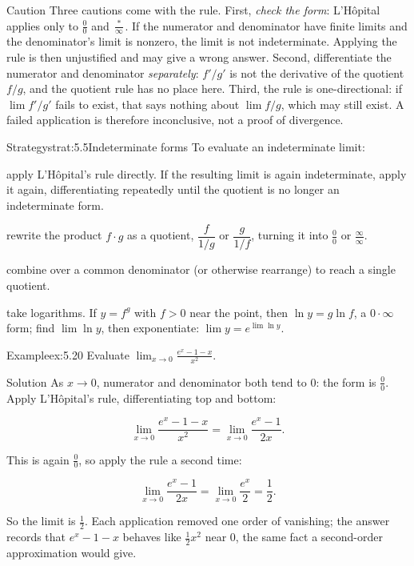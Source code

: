 \documentclass[a4paper,12pt,oneside]{memoir}
\begin{document}
\begin{envcaution}{Caution}{}{}
Three cautions come with the rule. First, \emph{check the form}: L’Hôpital applies only to \(\tfrac{0}{0}\) and \(\tfrac{\ast}{\infty}\). If the numerator and denominator have finite limits and the denominator’s limit is nonzero, the limit is not indeterminate. Applying the rule is then unjustified and may give a wrong answer. Second, differentiate the numerator and denominator \emph{separately}: \(f'\!/g'\) is not the derivative of the quotient \(f/g\), and the quotient rule has no place here. Third, the rule is one-directional: if \(\lim f'\!/g'\) fails to exist, that says nothing about \(\lim f/g\), which may still exist. A failed application is therefore inconclusive, not a proof of divergence.
\end{envcaution}
\begin{envstrategy}{Strategy}{strat:5.5}{Indeterminate forms}
To evaluate an indeterminate limit:

\begin{steps}
  \item {} apply L’Hôpital’s rule directly. If the resulting limit is again indeterminate, apply it again, differentiating repeatedly until the quotient is no longer an indeterminate form.
  \item \runin{\(0 \cdot \infty\):} rewrite the product \(f\cdot g\) as a quotient, \(\dfrac{f}{1/g}\) or \(\dfrac{g}{1/f}\), turning it into \(\tfrac{0}{0}\) or \(\tfrac{\infty}{\infty}\).
  \item \runin{\(\infty - \infty\):} combine over a common denominator (or otherwise rearrange) to reach a single quotient.
  \item {} take logarithms. If \(y = f^{g}\) with \(f > 0\) near the point, then \(\ln y = g\ln f\), a \(0 \cdot \infty\) form; find \(\lim \ln y\), then exponentiate: \(\lim y = e^{\lim \ln y}\).
\end{steps}
\end{envstrategy}
\begin{workedexample}
\begin{envexample}{Example}{ex:5.20}{}
Evaluate \(\displaystyle \lim_{x \to 0} \frac{e^{x} - 1 - x}{x^{2}}\).
\end{envexample}
\begin{envsolution}{Solution}{}{}
As \(x \to 0\), numerator and denominator both tend to \(0\): the form is \(\tfrac{0}{0}\). Apply L’Hôpital’s rule, differentiating top and bottom:

\[ \lim_{x \to 0} \frac{e^{x} - 1 - x}{x^{2}} = \lim_{x \to 0} \frac{e^{x} - 1}{2x}. \]

This is again \(\tfrac{0}{0}\), so apply the rule a second time:

\[ \lim_{x \to 0} \frac{e^{x} - 1}{2x} = \lim_{x \to 0} \frac{e^{x}}{2} = \frac{1}{2}. \]

So the limit is \(\tfrac{1}{2}\). Each application removed one order of vanishing; the answer records that \(e^{x} - 1 - x\) behaves like \(\tfrac{1}{2}x^{2}\) near \(0\), the same fact a second-order approximation would give. \qedmark
\end{envsolution}
\end{workedexample}
\end{document}
